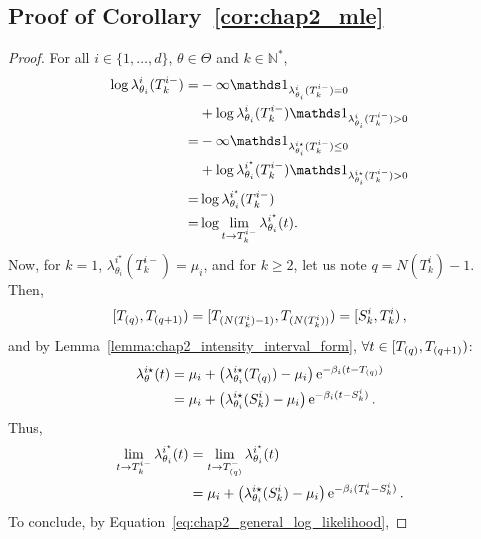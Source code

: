 \begin{subappendices}
  \section{Proof of Corollary~\ref{cor:chap2_mle}} \label{app:chap2_proof_cor_mle}
      \begin{proof}
            For all \(i \in \{1, \dots, d\}\), \(\theta \in \Theta\) and \(k \in \mathbb N^*\),
            \begin{align*}
              \log{\lambda^i_{\theta_i}(T_k^{i-})}
              = &- \infty \II_{\lambda^i_{\theta_i}(T_k^{i-}) = 0} \\
              &+ \log{\lambda^i_{\theta_i}(T_k^{i-})} \II_{\lambda^i_{\theta_i}(T_k^{i-}) > 0} \\
              = &- \infty \II_{\lambda^{i\star}_{\theta_i}(T_k^{i-}) \le 0} \\
              &+ \log{\lambda^{i^\star}_{\theta_i}(T_k^{i-})} \II_{\lambda^{i\star}_{\theta_i}(T_k^{i-}) > 0} \\
              = &\log{\lambda^{i^\star}_{\theta_i}(T_k^{i-})} \\
              = &\log{\lim_{t \to T_k^{i-}} \lambda^{i^\star}_{\theta_i}(t)}.
            \end{align*}
            Now, for \(k=1\), \(\lambda^{i^\star}_{\theta_i}(T_k^{i-}) = \mu_i\),
            and for \(k \geq 2\), let us note \(q = N(T_k^i)-1\).
            Then,
            \[
              [T\park[q], T\park[q+1]) = [T\park[N(T_k^i)-1], T\park[N(T_k^i)]) = [S_k^i, T_k^i) \,,
            \]
            and by Lemma~\ref{lemma:chap2_intensity_interval_form}, \(\forall t \in [T\park[q], T\park[q+1])\):
            \begin{align*}
              \lambda_\theta^{i\star}(t)
              &= \mu_i + \left(\lambda_{\theta_i}^{i\star}(T\park[q]) - \mu_i\right)\mathrm{e}^{-\beta_i(t-T\park[q])}\\
              &= \mu_i + \left(\lambda_{\theta_i}^{i\star}(S_k^i) - \mu_i\right)\mathrm{e}^{-\beta_i(t-S_k^i)}\,.
            \end{align*}
            Thus, 
            \begin{align*}
              \lim_{t \to T_k^{i-}} \lambda^{i^\star}_{\theta_i}(t)
              &= \lim_{t \to T\park[q]^{-}} \lambda^{i^\star}_{\theta_i}(t)\\
              &= \mu_i + \left(\lambda_{\theta_i}^{i\star}(S_k^i) - \mu_i\right)\mathrm{e}^{-\beta_i(T_k^{i}-S_k^i)}\,.
            \end{align*}
            To conclude, by Equation~\eqref{eq:chap2_general_log_likelihood},

\end{proof}
\end{subappendices}
